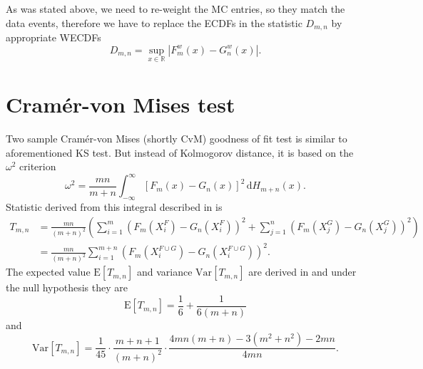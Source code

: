 As was stated above, we need to re-weight the MC entries, so they match the data events, therefore we have to replace the ECDFs in the statistic $D_{m,n}$ by appropriate WECDFs
\begin{equation}
D_{m,n} = \sup_{x \in \mathbb{R}} |F^w_m(x) - G^w_n(x)|.
\end{equation}

\section{Cram\'{e}r-von Mises test}
Two sample Cram\'{e}r-von Mises (shortly CvM) goodness of fit test is similar to aforementioned KS test. But instead of Kolmogorov distance, it is based on the $\omega^2$ criterion
\begin{equation}
\omega^2 = \frac{mn}{m+n} \int_{-\infty}^\infty \left[F_m(x) - G_n(x) \right]^2 \,\mathrm{d} H_{m+n}(x).
\end{equation} 
Statistic derived from this integral described in \cite{Anderson1962} is
\begin{align}
T_{m,n} & = \frac{mn}{(m+n)^2}\left( \sum_{i=1}^m \left( F_m\left(X^F_i\right) - G_n\left(X^F_i\right)\right)^2 + \sum_{j=1}^n \left( F_m\left(X^G_j\right) - G_n\left(X^G_j\right)\right)^2 \right) \\
& = \frac{mn}{(m+n)^2} \sum_{i=1}^{m+n} \left( F_m\left(X^{F\cup G}_i\right) - G_n\left(X^{F\cup G}_i\right)\right)^2 .
\label{eq:CMstat} %
\end{align}
The expected value $\mathrm{E} [T_{m,n}]$ and variance $\mathrm{Var} [T_{m,n}]$ are derived in \cite{Anderson1962} and  under the null hypothesis they are 
\begin{equation}
\mathrm{E} [T_{m,n}] = \frac{1}{6} + \frac{1}{6(m+n)}
\end{equation}
and
\begin{equation}
\mathrm{Var} [T_{m,n}] = \frac{1}{45} \cdot \frac{m+n+1}{(m+n)^2} \cdot \frac{4mn(m+n) - 3(m^2 + n^2)-2mn}{4mn}.
\end{equation}
